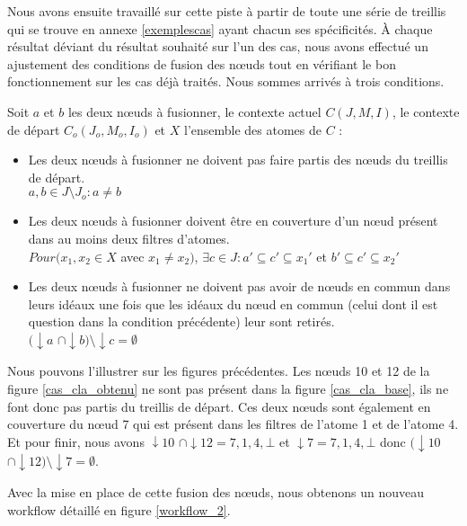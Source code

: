 Nous avons ensuite travaillé sur cette piste à partir de toute une série de treillis qui se trouve en annexe \ref{exemplescas} ayant chacun ses spécificités. À chaque résultat déviant du résultat souhaité sur l'un des cas, nous avons effectué un ajustement des conditions de fusion des n\oe uds tout en vérifiant le bon fonctionnement sur les cas déjà traités. Nous sommes arrivés à trois conditions.

\begin{definition}
Soit $a$ et $b$ les deux n\oe uds à fusionner, le contexte actuel $C(J, M, I)$, le contexte de départ $C_o(J_o, M_o, I_o)$ et $X$ l'ensemble des atomes de $C$ :
\begin{itemize}
	\item Les deux n\oe uds à fusionner ne doivent pas faire partis des n\oe uds du treillis de départ.\\
	$a, b \in J \setminus J_o : a \neq b$
	\item Les deux n\oe uds à fusionner doivent être en couverture d'un n\oe ud présent dans au moins deux filtres d'atomes.\\
	$Pour (x_1, x_2 \in X$ avec $x_1 \neq x_2)$, $\exists c \in J : a' \subseteq c' \subseteq x_1'$ et $b' \subseteq c' \subseteq x_2'$
	\item Les deux n\oe uds à fusionner ne doivent pas avoir de n\oe uds en commun dans leurs idéaux une fois que les idéaux du n\oe ud en commun (celui dont il est question dans la condition précédente) leur sont retirés.\\
	$(\downarrow \! a$ $\cap \downarrow \! b) \setminus \downarrow \! c = \emptyset$
\end{itemize}
\end{definition}

Nous pouvons l'illustrer sur les figures précédentes. Les n\oe uds 10 et 12 de la figure \ref{cas_cla_obtenu} ne sont pas présent dans la figure \ref{cas_cla_base}, ils ne font donc pas partis du treillis de départ. Ces deux n\oe uds sont également en couverture du n\oe ud 7 qui est présent dans les filtres de l'atome 1 et de l'atome 4. Et pour finir, nous avons $\downarrow \! 10$ $\cap \downarrow \! 12 = {7, 1, 4, \bot}$ et $\downarrow \! 7 = {7, 1, 4, \bot}$ donc $(\downarrow \! 10$ $\cap \downarrow \! 12) \setminus \downarrow \! 7 = \emptyset$.

\bigbreak

Avec la mise en place de cette fusion des n\oe uds, nous obtenons un nouveau workflow détaillé en figure \ref{workflow_2}.

